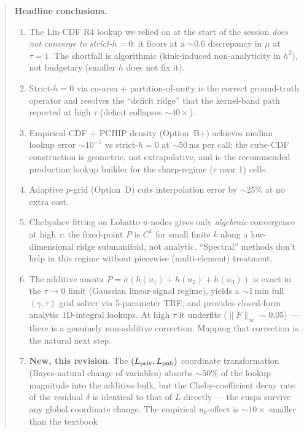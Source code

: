 \documentclass[11pt]{article}
\begin{document}
\begin{abstract}
\medskip
\noindent\textbf{Headline conclusions.}
\begin{enumerate}\itemsep1pt
  \item The Lin-CDF R4 lookup we relied on at the start of the
        session \emph{does not converge to strict-$h{=}0$}: it floors
        at a $\sim$0.6 discrepancy in $\mu$ at $\tau{=}1$. The shortfall is
        algorithmic (kink-induced non-analyticity in $h^2$), not budgetary
        (smaller $h$ does not fix it).
  \item Strict-$h{=}0$ via co-area + partition-of-unity is the correct
        ground-truth operator and resolves the ``deficit ridge'' that
        the kernel-band path reported at high $\tau$ (deficit collapses
        $\sim$$40{\times}$).
  \item Empirical-CDF + PCHIP density (Option~B+) achieves median lookup
        error $\sim 10^{-5}$ vs strict-$h{=}0$ at $\sim$50\,ms per call;
        the cube-CDF construction is geometric, not extrapolative, and
        is the recommended production lookup builder for the
        sharp-regime ($\tau$ near 1) cells.
  \item Adaptive $p$-grid (Option~D) cuts interpolation error by
        $\sim$25\% at no extra cost.
  \item Chebyshev fitting on Lobatto $u$-nodes gives only \emph{algebraic}
        convergence at high $\tau$: the fixed-point $P$ is $C^k$ for
        small finite $k$ along a low-dimensional ridge submanifold, not
        analytic. ``Spectral'' methods don't help in this regime
        without piecewise (multi-element) treatment.
  \item The additive ansatz $P = \sigma(h(u_1)+h(u_2)+h(u_3))$ is exact in
        the $\tau \to 0$ limit (Gaussian linear-signal regime), yields a
        $\sim$1\,min full $(\gamma, \tau)$ grid solver via 5-parameter
        TRF, and provides closed-form analytic 1D-integral lookups.
        At high $\tau$ it underfits ($\|F\|_\infty \sim 0.05$) --- there is
        a genuinely non-additive correction. Mapping that correction is
        the natural next step.
  \item \textbf{New, this revision.} The $(L_{\rm priv}, L_{\rm pub})$
        coordinate transformation (Bayes-natural change of variables)
        absorbs $\sim$50\% of the lookup magnitude into the additive
        bulk, but the Cheby-coefficient decay rate of the residual
        $\delta$ is identical to that of $L$ directly --- the cusps
        survive any global coordinate change. The empirical
        $u_k$-effect is $\sim 10{\times}$ smaller than the textbook
$$
\end{enumerate}
\end{abstract}
\end{document}
